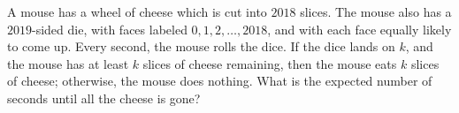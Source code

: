 A mouse has a wheel of cheese which is cut into $2018$ slices. The mouse also has a $2019$-sided die, with faces labeled $0,1,2,\ldots, 2018$, and with each face equally likely to come up. Every second, the mouse rolls the dice. If the dice lands on $k$, and the mouse has at least $k$ slices of cheese remaining, then the mouse eats $k$ slices of cheese; otherwise, the mouse does nothing. What is the expected number of seconds until all the cheese is gone?
